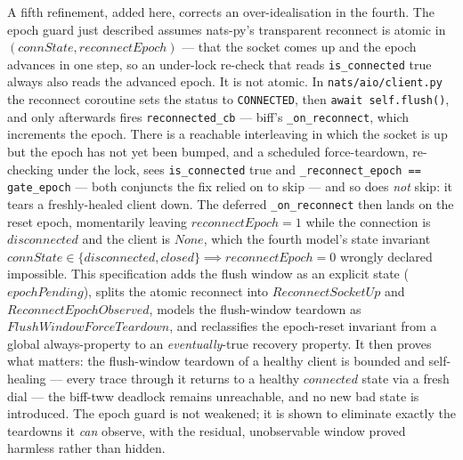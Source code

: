 \documentclass[a4paper,10pt,fleqn]{article}
\begin{document}
A fifth refinement, added here, corrects an over-idealisation in the
fourth.  The epoch guard just described assumes nats-py's transparent
reconnect is atomic in $(connState, reconnectEpoch)$ --- that the socket
comes up and the epoch advances in one step, so an under-lock re-check
that reads \texttt{is\_connected} true always also reads the advanced
epoch.  It is not atomic.  In \texttt{nats/aio/client.py} the reconnect
coroutine sets the status to \texttt{CONNECTED}, then \texttt{await
self.flush()}, and only afterwards fires \texttt{reconnected\_cb} ---
biff's \texttt{\_on\_reconnect}, which increments the epoch.  There is a
reachable interleaving in which the socket is up but the epoch has not yet
been bumped, and a scheduled force-teardown, re-checking under the lock,
sees \texttt{is\_connected} true and \texttt{\_reconnect\_epoch ==
gate\_epoch} --- both conjuncts the fix relied on to skip --- and so does
\emph{not} skip: it tears a freshly-healed client down.  The deferred
\texttt{\_on\_reconnect} then lands on the reset epoch, momentarily
leaving $reconnectEpoch = 1$ while the connection is $disconnected$ and
the client is $None$, which the fourth model's state invariant $connState
\in \{ disconnected, closed \} \implies reconnectEpoch = 0$ wrongly
declared impossible.  This specification adds the flush window as an
explicit state ($epochPending$), splits the atomic reconnect into
$ReconnectSocketUp$ and $ReconnectEpochObserved$, models the flush-window
teardown as $FlushWindowForceTeardown$, and reclassifies the epoch-reset
invariant from a global always-property to an \emph{eventually}-true
recovery property.  It then proves what matters: the flush-window teardown
of a healthy client is bounded and self-healing --- every trace through it
returns to a healthy $connected$ state via a fresh dial --- the biff-tww
deadlock remains unreachable, and no new bad state is introduced.  The
epoch guard is not weakened; it is shown to eliminate exactly the
teardowns it \emph{can} observe, with the residual, unobservable window
proved harmless rather than hidden.
\end{document}

